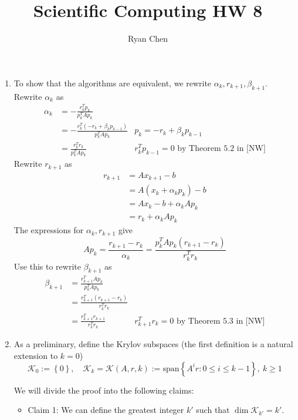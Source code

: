 \documentclass{article}
\title{Scientific Computing HW 8}
\author{Ryan Chen}
\newcommand{\brc}[1]{\left\{#1\right\}}
\renewcommand{\a}{\alpha}
\renewcommand{\b}{\beta}
\newcommand{\K}{\mathcal{K}}
\begin{document}
	
\maketitle



\begin{enumerate}
	
	
	
	\item To show that the algorithms are equivalent, we rewrite $\a_k,r_{k+1},\b_{k+1}$. Rewrite $\a_k$ as
	\begin{align*}
		\a_k &= -\frac{r_k^Tp_k}{p_k^TAp_k} \\
		&= -\frac{r_k^T(-r_k+\b_kp_{k-1})}{p_k^TAp_k} & p_k = -r_k+\b_kp_{k-1} \\
		&= \frac{r_k^Tr_k}{p_k^TAp_k} & \text{$r_k^Tp_{k-1}=0$ by Theorem 5.2 in [NW]}
	\end{align*}
	Rewrite $r_{k+1}$ as
	\begin{align*}
		r_{k+1} &= Ax_{k+1} - b \\
		&= A(x_k+\a_kp_k) - b \\
		&= Ax_k - b + \a_kAp_k \\
		&= r_k + \a_kAp_k
	\end{align*}
	The expressions for $\a_k,r_{k+1}$ give
	\[Ap_k = \frac{r_{k+1}-r_k}{\a_k} = \frac{p_k^TAp_k(r_{k+1}-r_k)}{r_k^Tr_k}\]
	Use this to rewrite $\b_{k+1}$ as
	\begin{align*}
		\b_{k+1} &= \frac{r_{k+1}^TAp_k}{p_k^TAp_k} \\
		&= \frac{r_{k+1}^T(r_{k+1}-r_k)}{r_k^Tr_k} \\
		&= \frac{r_{k+1}^Tr_{k+1}}{r_k^Tr_k} & \text{$r_{k+1}^Tr_k=0$ by Theorem 5.3 in [NW]}
	\end{align*}
	
	
	
	\pagebreak
	
	
	
	\item As a preliminary, define the Krylov subspaces (the first definition is a natural extension to $k=0$)
	\[\K_0 := \brc0,
	\quad \K_k = \K(A,r,k) := \mathrm{span}\brc{A^ir: 0\le i\le k-1},~ k\ge1\]
	
	
	We will divide the proof into the following claims:
	\begin{itemize}
		
		
		\item Claim 1: We can define the greatest integer $k'$ such that $\dim\K_{k'}=k'$.
		

\end{itemize}
\end{enumerate}
\end{document}
